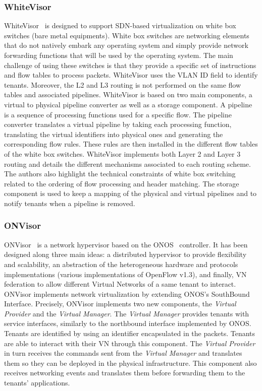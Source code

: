 \subsubsection{WhiteVisor}
WhiteVisor~\cite{whitevisor-Yu2019} is designed to support SDN-based virtualization on white box switches (\ie bare metal equipments).
White box switches are networking elements that do not natively embark any operating system and simply provide network forwarding functions that will be used by the operating system.  
The main challenge of using these switches is that they provide a specific set of instructions and flow tables to process packets. 
WhiteVisor uses the VLAN ID field to identify tenants.
Moreover, the L2 and L3 routing is not performed on the same flow tables and associated pipelines.
WhiteVisor is based on two main components, a virtual to physical pipeline converter as well as a storage component.
A pipeline is a sequence of processing functions used for a specific flow.
The pipeline converter translates a virtual pipeline by taking each processing function, translating the virtual identifiers into physical ones and generating the corresponding flow rules. These rules are then installed in the different flow tables of the white box switches. WhiteVisor implements both Layer 2 and Layer 3 routing and details the different mechanisms associated to each routing scheme. The authors also highlight the technical constraints of white box switching related to the ordering of flow processing and header matching. The storage component is used to keep a mapping of the physical and virtual pipelines and to notify tenants when a pipeline is removed. 


\subsubsection{ONVisor}
ONVisor~\cite{ONVisor-Han2018} is a network hypervisor based on the ONOS~\cite{onos-Berde2014a} controller.
It has been designed along three main ideas: a distributed hypervisor to provide flexibility and scalability, an abstraction of the heterogeneous hardware and protocols implementations (\eg various implementations of OpenFlow v1.3),  and finally, VN federation to allow different Virtual Networks of a same tenant to interact.
ONVisor implements network virtualization by extending ONOS's SouthBound Interface.
Precisely, ONVisor implements two new components, the \textit{Virtual Provider} and the \textit{Virtual Manager}.
The \textit{Virtual Manager} provides tenants with service interfaces, similarly to the northbound interface implemented by ONOS. 
Tenants are identified by using an identifier encapsulated in the packets.
Tenants are able to interact with their VN through this component.
The \textit{Virtual Provider} in turn receives the commands sent from the \textit{Virtual Manager} and translates them so they can be deployed in the physical infrastructure. This component also receives networking events and translates them before forwarding them to the tenants' applications.

